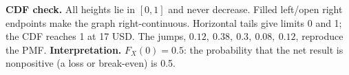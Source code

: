   \par
  \textbf{CDF check.} All heights lie in $[0,1]$ and never decrease. Filled left/open right endpoints make the
  graph right-continuous. Horizontal tails give limits 0 and 1; the CDF reaches 1 at 17 USD. The jumps, $0.12,\
    0.38,\ 0.3,\ 0.08,\ 0.12$, reproduce the PMF.
  \textbf{Interpretation.} $F_X(0)=0.5$: the probability that the net result is nonpositive (a loss or
  break-even) is 0.5.
  \vfill
  \clearpage
\fi

